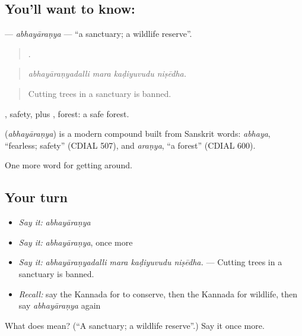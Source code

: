 \subsection*{You'll want to know: }
\textbf{} — \emph{abhayāraṇya} — \textquotedblleft{}a sanctuary; a wildlife reserve\textquotedblright{}.

\begin{quote}
   .
\end{quote}

\begin{quote}
\emph{abhayāraṇyadalli mara kaḍiyuvudu niṣēdha.}
\end{quote}

\begin{quote}
Cutting trees in a sanctuary is banned.
\end{quote}

, safety, plus , forest: a safe forest.

\begin{cousinweb}
\textbf{} (\emph{abhayāraṇya}) is a modern compound built from Sanskrit words: \emph{abhaya}, \textquotedblleft{}fearless; safety\textquotedblright{} (CDIAL 507), and \emph{araṇya}, \textquotedblleft{}a forest\textquotedblright{} (CDIAL 600).
\end{cousinweb}

\begin{grammarlens}[title={What you've built}]
One more word for getting around.
\end{grammarlens}

\subsection*{Your turn}
\begin{itemize}
\raggedright
  \item \emph{Say it:} \emph{abhayāraṇya}
  \item \emph{Say it:} \emph{abhayāraṇya}, once more
  \item \emph{Say it:} \emph{abhayāraṇyadalli mara kaḍiyuvudu niṣēdha.} — Cutting trees in a sanctuary is banned.
  \item \emph{Recall:} say the Kannada for to conserve, then the Kannada for wildlife, then say \emph{abhayāraṇya} again
\end{itemize}

\begin{tcolorbox}[breakable,colback=teal!4,colframe=teal!35!black,title={Before you move on}]
What does  mean? (\textquotedblleft{}A sanctuary; a wildlife reserve\textquotedblright{}.) Say it once more.
\end{tcolorbox}
